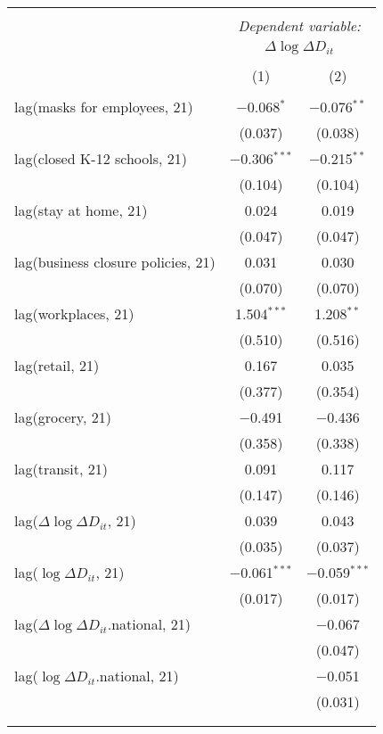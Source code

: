 \begin{tabular}{@{\extracolsep{1pt}}lcc} 
\\[-1.8ex]\hline 
\hline \\[-1.8ex] 
 & \multicolumn{2}{c}{\textit{Dependent variable:}} \\ 
\cline{2-3} 
 & \multicolumn{2}{c}{$\Delta \log \Delta D_{it}$} \\ 
\\[-1.8ex] & (1) & (2)\\ 
\hline \\[-1.8ex] 
 lag(masks for employees, 21) & $-$0.068$^{*}$ & $-$0.076$^{**}$ \\ 
  & (0.037) & (0.038) \\ 
  lag(closed K-12 schools, 21) & $-$0.306$^{***}$ & $-$0.215$^{**}$ \\ 
  & (0.104) & (0.104) \\ 
  lag(stay at home, 21) & 0.024 & 0.019 \\ 
  & (0.047) & (0.047) \\ 
  lag(business closure policies, 21) & 0.031 & 0.030 \\ 
  & (0.070) & (0.070) \\ 
  lag(workplaces, 21) & 1.504$^{***}$ & 1.208$^{**}$ \\ 
  & (0.510) & (0.516) \\ 
  lag(retail, 21) & 0.167 & 0.035 \\ 
  & (0.377) & (0.354) \\ 
  lag(grocery, 21) & $-$0.491 & $-$0.436 \\ 
  & (0.358) & (0.338) \\ 
  lag(transit, 21) & 0.091 & 0.117 \\ 
  & (0.147) & (0.146) \\ 
  lag($\Delta \log \Delta D_{it}$, 21) & 0.039 & 0.043 \\ 
  & (0.035) & (0.037) \\ 
  lag($\log \Delta D_{it}$, 21) & $-$0.061$^{***}$ & $-$0.059$^{***}$ \\ 
  & (0.017) & (0.017) \\ 
  lag($\Delta \log \Delta D_{it}$.national, 21) &  & $-$0.067 \\ 
  &  & (0.047) \\ 
  lag($\log \Delta D_{it}$.national, 21) &  & $-$0.051 \\ 
  &  & (0.031) \\ 
   &  &  \\ 
  &  &  \\ 

\end{tabular}
